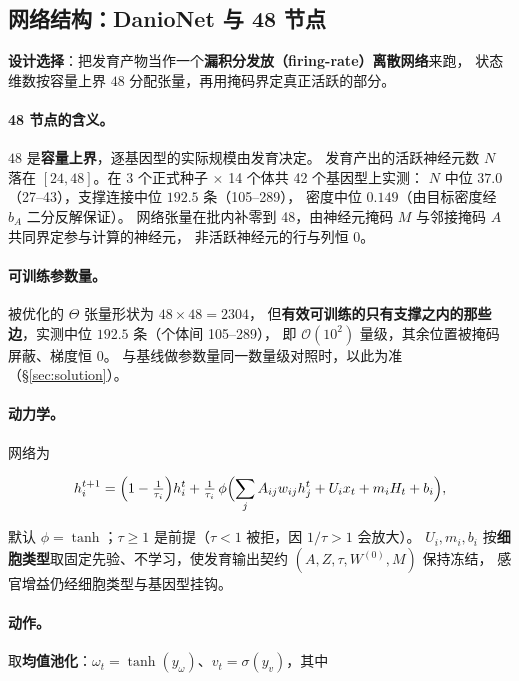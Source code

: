 \subsection{网络结构：DanioNet 与 48 节点}\label{method:net}

\textbf{设计选择}：把发育产物当作一个\textbf{漏积分发放（firing-rate）离散网络}来跑，
状态维数按容量上界 $48$ 分配张量，再用掩码界定真正活跃的部分。

\paragraph{48 节点的含义。}$48$ 是\textbf{容量上界}，逐基因型的实际规模由发育决定。
发育产出的活跃神经元数 $N$ 落在 $[24,48]$。在 3 个正式种子 $\times$ 14 个体共 42 个基因型上实测：
$N$ 中位 $37.0$（27--43），支撑连接中位 $192.5$ 条（105--289），
密度中位 $0.149$（由目标密度经 $b_A$ 二分反解保证）。
网络张量在批内补零到 48，由神经元掩码 $M$ 与邻接掩码 $A$ 共同界定参与计算的神经元，
非活跃神经元的行与列恒 0。

\paragraph{可训练参数量。}被优化的 $\Theta$ 张量形状为 $48\times48=2304$，
但\textbf{有效可训练的只有支撑之内的那些边}，实测中位 $192.5$ 条（个体间 105--289），
即 $\mathcal O(10^2)$ 量级，其余位置被掩码屏蔽、梯度恒 0。
与基线做参数量同一数量级对照时，以此为准（\S\ref{sec:solution}）。

\paragraph{动力学。}网络为

\begin{equation}\label{method:eq-dyn}
h_i^{t+1}=\Bigl(1-\tfrac{1}{\tau_i}\Bigr)h_i^{t}
+\tfrac{1}{\tau_i}\,\phi\Bigl(\sum_j A_{ij}w_{ij}h_j^{t}+U_i x_t+m_i H_t+b_i\Bigr),
\end{equation}

默认 $\phi=\tanh$；$\tau\ge1$ 是前提（$\tau<1$ 被拒，因 $1/\tau>1$ 会放大）。
$U_i,m_i,b_i$ 按\textbf{细胞类型}取固定先验、不学习，使发育输出契约 $(A,Z,\tau,W^{(0)},M)$ 保持冻结，
感官增益仍经细胞类型与基因型挂钩。

\paragraph{动作。}取\textbf{均值池化}：$\omega_t=\tanh(y_\omega)$、$v_t=\sigma(y_v)$，其中

